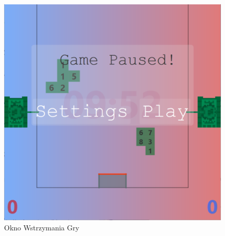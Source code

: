 \documentclass[11pt,a4paper]{report}
\begin{document}
\begin{itemize}
\begin{figure}[!ht]
\centerline{\includegraphics{img/stop.png}}
\caption{ Okno Wstrzymania Gry }
\end{figure}
\end{itemize}
\newpage
\end{document}
